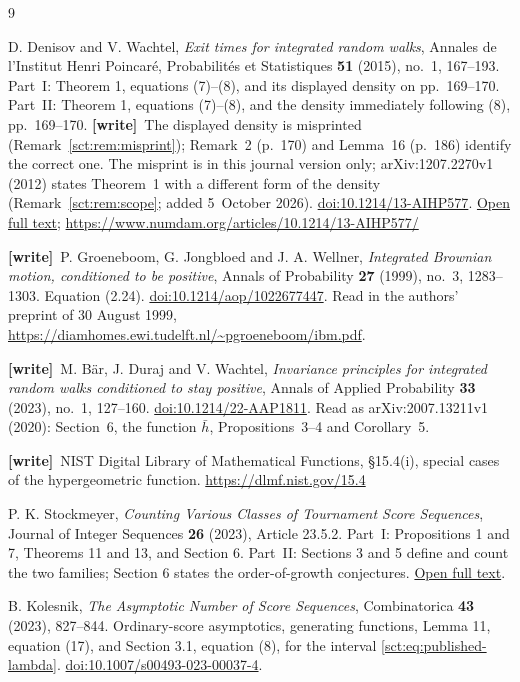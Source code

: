 \documentclass[11pt,letterpaper]{article}
\theoremstyle{definition}\newtheorem{remark}[theorem]{Remark}
\newcommand{\wtag}{\textup{\textbf{[write]}}}
\begin{document}
\begin{thebibliography}{9}
\raggedright
{}
D. Denisov and V. Wachtel,
\emph{Exit times for integrated random walks},
Annales de l'Institut Henri Poincar\'e, Probabilit\'es et Statistiques
\textbf{51} (2015), no.~1, 167--193.
Part~I: Theorem 1, equations (7)--(8), and its displayed density on pp.~169--170.
Part~II: Theorem 1, equations (7)--(8), and the density immediately following (8), pp.~169--170.
\wtag\ The displayed density is misprinted (Remark~\ref{sct:rem:misprint}); Remark~2 (p.~170) and Lemma~16 (p.~186) identify the correct one. The misprint is in this journal version only; arXiv:1207.2270v1 (2012) states Theorem~1 with a different form of the density (Remark~\ref{sct:rem:scope}; added 5~October 2026).
\href{https://doi.org/10.1214/13-AIHP577}{doi:10.1214/13-AIHP577}.
\href{https://www.numdam.org/item/10.1214/13-AIHP577.pdf}{Open full text};
\url{https://www.numdam.org/articles/10.1214/13-AIHP577/}

\wtag\ P. Groeneboom, G. Jongbloed and J. A. Wellner,
\emph{Integrated Brownian motion, conditioned to be positive},
Annals of Probability \textbf{27} (1999), no.~3, 1283--1303. Equation (2.24).
\href{https://doi.org/10.1214/aop/1022677447}{doi:10.1214/aop/1022677447}.
Read in the authors' preprint of 30 August 1999,
\url{https://diamhomes.ewi.tudelft.nl/~pgroeneboom/ibm.pdf}.

\wtag\ M. B\"ar, J. Duraj and V. Wachtel,
\emph{Invariance principles for integrated random walks conditioned to stay positive},
Annals of Applied Probability \textbf{33} (2023), no.~1, 127--160.
\href{https://doi.org/10.1214/22-AAP1811}{doi:10.1214/22-AAP1811}.
Read as arXiv:2007.13211v1 (2020): Section~6, the function $\bar h$, Propositions~3--4 and Corollary~5.

\wtag\ NIST Digital Library of Mathematical Functions, \S15.4(i), special cases of the hypergeometric function.
\url{https://dlmf.nist.gov/15.4}

P. K. Stockmeyer,
\emph{Counting Various Classes of Tournament Score Sequences},
Journal of Integer Sequences \textbf{26} (2023), Article 23.5.2.
Part~I: Propositions 1 and 7, Theorems 11 and 13, and Section 6.
Part~II: Sections 3 and 5 define and count the two families; Section 6 states the
order-of-growth conjectures.
\href{https://cs.uwaterloo.ca/journals/JIS/VOL26/Stockmeyer/stock14.pdf}{Open full text}.

B. Kolesnik,
\emph{The Asymptotic Number of Score Sequences},
Combinatorica \textbf{43} (2023), 827--844.
Ordinary-score asymptotics, generating functions, Lemma 11, equation (17),
and Section 3.1, equation (8), for the interval \eqref{sct:eq:published-lambda}.
\href{https://doi.org/10.1007/s00493-023-00037-4}{doi:10.1007/s00493-023-00037-4}.


\end{thebibliography}
\end{document}
